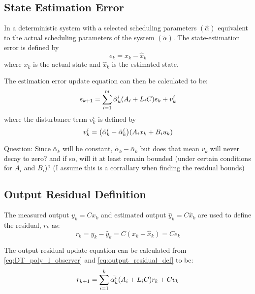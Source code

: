 \documentclass[]{article}
\begin{document}
\subsection{State Estimation Error}
In a deterministic system with a selected scheduling parameters $(\hat{\alpha})$ equivalent to the actual scheduling parameters of the system $(\tilde{\alpha})$. The state-estimation error is defined by
\begin{equation}\label{eq:est_error_def}
	e_k = x_k - \hat{x}_k
\end{equation}
where $x_k$ is the actual state and $\hat{x}_k$ is the estimated state.

The estimation error update equation can then be calculated to be:
\begin{equation}\label{eq:est_error_update_def}
	e_{k+1} = \sum_{i=1}^{m} \hat{\alpha}_k^i \qty(A_i + L_i C) e_k + v_k^i
\end{equation}
where the disturbance term $v_k^i$ is defined by
\begin{equation}\label{eq:param_error_disturbance_def}
	v_k^i = \qty(\tilde{\alpha}_k^i - \bar{\alpha}_k^i) \qty(A_i x_k + B_i u_k)
\end{equation}

Question: Since $\bar{\alpha}_k$ will be constant, $\tilde{\alpha}_k - \bar{\alpha}_k$ but does that mean $v_k$ will never decay to zero? and if so, will it at least remain bounded (under certain conditions for $A_i$ and $B_i$)? (I assume this is a corrallary when finding the residual bounds)

\subsection{Output Residual Definition}
The measured output $y_k = C x_k$ and estimated output $\hat{y}_k = C \hat{x}_k$ are used to define the residual, $r_k$ as:
\begin{equation}\label{eq:output_residual_def}
	r_k = y_k - \hat{y}_k = C(x_k - \hat{x}_k) = C e_k
\end{equation}

The output residual update equation can be calculated from \eqref{eq:DT_poly_l_observer} and \eqref{eq:output_residual_def} to be:
\begin{equation}\label{eq:output_residual_update_def}
	r_{k+1} = \sum_{i=1}^k \bar{\alpha_k^i} \qty(A_i + L_i C) r_k + C v_k
\end{equation}

\newpage
\end{document}

